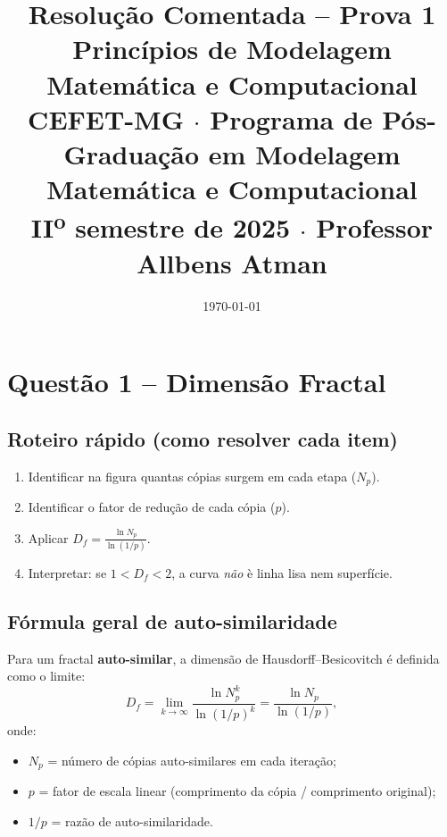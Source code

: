 \documentclass[12pt,a4paper]{article}
\title{%
  \textbf{Resolu\c{c}\~ao Comentada -- Prova 1}\\[0.6ex]
  \large Princ\'ipios de Modelagem Matem\'atica e Computacional\\[0.3ex]
  \normalsize CEFET-MG $\cdot$ Programa de P\'os-Gradua\c{c}\~ao em
  Modelagem Matem\'atica e Computacional\\
  II\textsuperscript{o} semestre de 2025 $\cdot$ Professor Allbens Atman
}
\author{}
\date{\today}
\theoremstyle{definition}
\begin{document}

\maketitle
\tableofcontents
\newpage

\section{Quest\~ao 1 -- Dimens\~ao Fractal}

\subsection*{Roteiro r\'apido (como resolver cada item)}
\begin{enumerate}
  \item Identificar na figura quantas c\'opias surgem em cada etapa ($N_p$).
  \item Identificar o fator de redu\c{c}\~ao de cada c\'opia ($p$).
  \item Aplicar $\displaystyle D_f=\frac{\ln N_p}{\ln(1/p)}$.
  \item Interpretar: se $1<D_f<2$, a curva \emph{n\~ao} \`e linha lisa nem superf\'icie.
\end{enumerate}

\subsection{F\'ormula geral de auto-similaridade}

Para um fractal \textbf{auto-similar}, a dimens\~ao de Hausdorff--Besicovitch \'e
definida como o limite:
\begin{equation}
  D_f = \lim_{k\to\infty} \frac{\ln N_p^k}{\ln(1/p)^k}
      = \frac{\ln N_p}{\ln(1/p)},
  \label{eq:df}
\end{equation}
onde:
\begin{itemize}
  \item $N_p$ = n\'umero de c\'opias auto-similares em cada itera\c{c}\~ao;
  \item $p$ = fator de escala linear (comprimento da c\'opia / comprimento original);
  \item $1/p$ = raz\~ao de auto-similaridade.
\end{itemize}
\end{document}
